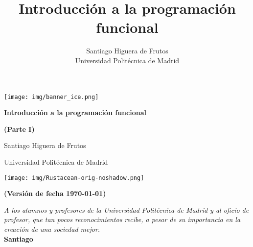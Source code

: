 \documentclass[11pt, table]{book}
\title{Introducción a la programación funcional}
\author{Santiago Higuera de Frutos \\ \vspace{1em}\small Universidad Politécnica de Madrid}
\date{ 
	\begin{center}
		\texttt{[image: img/Rustacean-orig-noshadow.png]}
	\end{center}
   \begin{center}
      \footnotesize \textbf{\color{red}(Versión de fecha  \today)}
   \end{center}
}
\begin{document}
\lstset{language=Rust, style=colouredRust}

\pagestyle{empty}

\begin{center}
   \texttt{[image: img/banner\_ice.png]}
\end{center}

{\centering \vspace{5em} \Huge\bfseries  Introducción a la programación funcional \par}

{\centering \vspace{5em} \Huge\bfseries  (Parte I) \par}

{\vspace{2em} \centering Santiago Higuera de Frutos \par}

{\centering \small Universidad Politécnica de Madrid \par}

\begin{center}
   \texttt{[image: img/Rustacean-orig-noshadow.png]}
\end{center}
\begin{center}
   \footnotesize \textbf{\color{red}(Versión de fecha  \today)}
\end{center}




\blankpage
\pagestyle{empty}

\vfill
\begin{flushright}
\begin{minipage}{0.7\textwidth}
\begin{flushright}
\footnotesize
\textit{A los alumnos y profesores de la Universidad Politécnica de Madrid y al oficio de profesor, que tan pocos reconocimientos recibe, a pesar de su importancia en la creación de una sociedad mejor.} \\
\textbf{Santiago}
\end{flushright}
\end{minipage}
\end{flushright}
\end{document}
